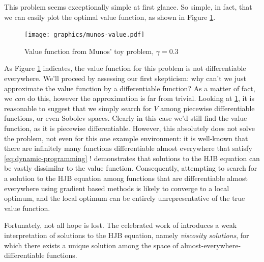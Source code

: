 This problem seems exceptionally simple at first glance. So simple, in
fact, that we can easily plot the optimal value function, as shown in
Figure \ref{fig:munos:value}.

\begin{figure}[h]
  \centering
  \texttt{[image: graphics/munos-value.pdf]}
  \caption[A non-differentiable value function]{Value function from
    Munos' toy problem, $\gamma=0.3$}\label{fig:munos:value}
\end{figure}

As Figure \ref{fig:munos:value} indicates, the value function for this
problem is not differentiable everywhere. We'll proceed by assessing
our first skepticism: why can't we just approximate the value function
by a differentiable function? As a matter of fact, we \emph{can} do
this, however the approximation is far from trivial. Looking at
\ref{fig:munos:value}, it is reasonable to suggest that we simply
search for $V$ among piecewise differentiable functions, or even
Sobolev spaces. Clearly in this case we'd still find the value
function, as it is piecewise differentiable. However, this absolutely
does not solve the problem, not even for this one example environment:
it is well-known that there are infinitely many functions
differentiable almost everywhere that satisfy
\eqref{eq:dynamic-programming} \citep{fleming2006controlled}!
\citet{Munos2004ASO} demonstrates that solutions to the HJB equation
can be vastly dissimilar to the value function. Consequently,
attempting to search for a solution to the HJB equation among
functions that are differentiable almost everywhere using gradient
based methods is likely to converge to a local optimum, and the local
optimum can be entirely unrepresentative of the true value function.

Fortunately, not all hope is lost. The celebrated work of
\citet{crandall1983viscosity} introduces a weak interpretation of
solutions to the HJB equation, namely \emph{viscosity solutions}, for
which there exists a unique solution among the space of
almost-everywhere-differentiable functions.

